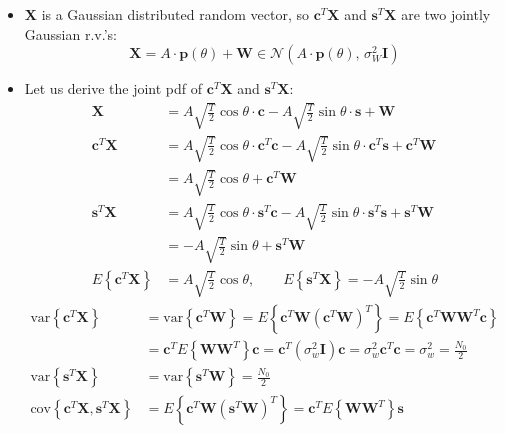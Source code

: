 \begin{itemize}
\[\]
    \item \textbf{X} is a Gaussian distributed random vector, so \(\mathbf{c}^T\mathbf{X}\) and \(\mathbf{s}^T\mathbf{X}\) are two jointly Gaussian r.v.'s:
    \[
\mathbf{X} = A \cdot \mathbf{p}(\theta) + \mathbf{W} \in \mathcal{N}\left(A \cdot \mathbf{p}(\theta),\, \sigma_W^2 \mathbf{I} \right)
\]
    \item Let us derive the joint pdf of \(\mathbf{c}^T\mathbf{X}\) and \(\mathbf{s}^T\mathbf{X}\):
    \[
\begin{aligned}
\mathbf{X} &= A\sqrt{\frac{T}{2}}\cos\theta\cdot\mathbf{c} - A\sqrt{\frac{T}{2}}\sin\theta\cdot\mathbf{s} + \mathbf{W} \\[2ex]
\mathbf{c}^T\mathbf{X} 
    &= A\sqrt{\frac{T}{2}}\cos\theta \cdot \mathbf{c}^T\mathbf{c} 
     - A\sqrt{\frac{T}{2}}\sin\theta \cdot \mathbf{c}^T\mathbf{s} + \mathbf{c}^T\mathbf{W} \\ 
    &= A\sqrt{\frac{T}{2}}\cos\theta + \mathbf{c}^T\mathbf{W} \\[2ex]
\mathbf{s}^T\mathbf{X}
    &= A\sqrt{\frac{T}{2}}\cos\theta \cdot \mathbf{s}^T\mathbf{c} 
     - A\sqrt{\frac{T}{2}}\sin\theta \cdot \mathbf{s}^T\mathbf{s} + \mathbf{s}^T\mathbf{W} \\
    &= -A\sqrt{\frac{T}{2}}\sin\theta + \mathbf{s}^T\mathbf{W} \\[2ex]
E\left\{\mathbf{c}^T\mathbf{X}\right\} &= A\sqrt{\frac{T}{2}}\cos\theta, \qquad
E\left\{\mathbf{s}^T\mathbf{X}\right\} = -A\sqrt{\frac{T}{2}}\sin\theta
\end{aligned}
\]
\[
\begin{aligned}
\mathrm{var}\left\{ \mathbf{c}^T\mathbf{X} \right\} 
    &= \mathrm{var}\left\{ \mathbf{c}^T\mathbf{W} \right\} 
     = E\left\{ \mathbf{c}^T \mathbf{W} (\mathbf{c}^T\mathbf{W})^{T}\right\} 
     = E\left\{ \mathbf{c}^T \mathbf{W} \mathbf{W}^T \mathbf{c}\right\} \\[2ex]
    &= \mathbf{c}^T E\left\{ \mathbf{W} \mathbf{W}^T \right\} \mathbf{c} 
     = \mathbf{c}^T \left( \sigma_w^2 \mathbf{I} \right) \mathbf{c}
     = \sigma_w^2 \mathbf{c}^T \mathbf{c}
     = \sigma_w^2 
     = \frac{N_0}{2} \\[3ex]
\mathrm{var}\left\{ \mathbf{s}^T\mathbf{X} \right\}
    &= \mathrm{var}\left\{ \mathbf{s}^T\mathbf{W} \right\}
     = \frac{N_0}{2} \\[3ex]
\mathrm{cov}\left\{ \mathbf{c}^T\mathbf{X}, \mathbf{s}^T\mathbf{X} \right\}
    &= E\left\{ \mathbf{c}^T \mathbf{W} (\mathbf{s}^T \mathbf{W})^T \right\}
     = \mathbf{c}^T E\left\{ \mathbf{W} \mathbf{W}^T \right\} \mathbf{s} 

\end{aligned}\]
\end{itemize}
